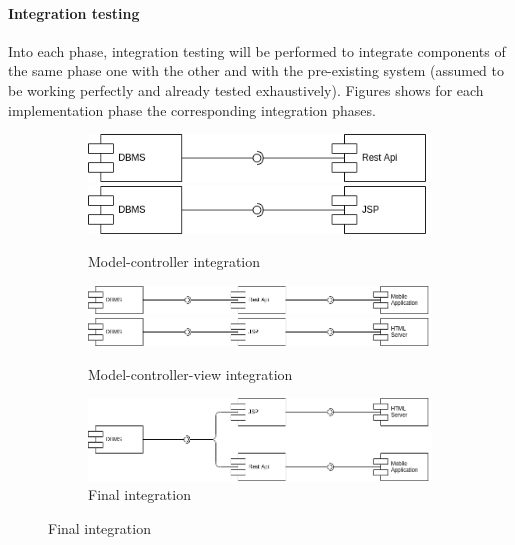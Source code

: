 \documentclass{article}
\begin{document}
\paragraph{Integration testing} Into each phase, integration testing will be performed to integrate components of the same phase one with the other and with the pre-existing system (assumed to be working perfectly and already tested exhaustively). Figures  shows for each implementation phase the corresponding integration phases.
	\begin{figure}[h]
		\caption{Prototype integration}
		\label{fig:integrationPrototype}
		\centering
		\begin{subfigure}[H]{\linewidth}
			\includegraphics[width=.5\textwidth]{images/Integration_prototype_1.png}
			\includegraphics[width=.5\textwidth]{images/Integration_prototype_3.png}
			\caption{Model-controller integration}
		\end{subfigure}
		\begin{subfigure}[H]{\linewidth}
			\centering
			\includegraphics[width=\textwidth]{images/Integration_prototype_2.png}
			\includegraphics[width=\textwidth]{images/Integration_prototype_4.png}
			\caption{Model-controller-view integration}
		\end{subfigure}
		\begin{subfigure}[H]{\linewidth}
			\includegraphics[width=\textwidth]{images/Integration_prototype_5.png}
			\caption{Final integration}
		\end{subfigure}
	\end{figure}
\end{document}
